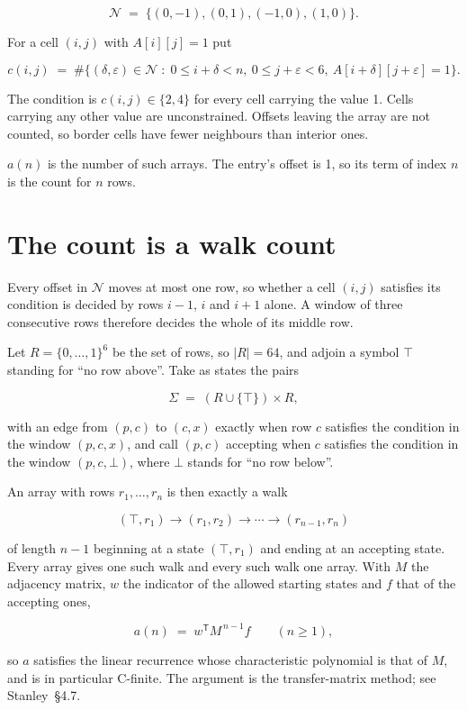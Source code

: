 \documentclass[11pt]{article}
\theoremstyle{definition}
\begin{document}
\[\mathcal{N} \;=\; \{(0,-1), (0,1), (-1,0), (1,0)\}.\]

For a cell $(i,j)$ with $A[i][j] = 1$ put

\[c(i,j) \;=\; \#\bigl\{(\delta,\varepsilon)\in\mathcal{N} \;:\; 0\le i+\delta<n,\ 0\le j+\varepsilon<6,\ A[i+\delta][j+\varepsilon] = 1\bigr\}.\]

The condition is $c(i,j) \in \{2, 4\}$ for every cell carrying the value 1. Cells carrying any other value are unconstrained. Offsets leaving the array are not counted, so border cells have fewer neighbours than interior ones.

$a(n)$ is the number of such arrays. The entry's offset is 1, so its term of index $n$ is the count for $n$ rows.

\section{The count is a walk count}

Every offset in $\mathcal{N}$ moves at most one row, so whether a cell $(i,j)$ satisfies its condition is decided by rows $i-1$, $i$ and $i+1$ alone. A window of three consecutive rows therefore decides the whole of its middle row.

Let $R = \{0,\dots,1\}^{6}$ be the set of rows, so $|R| = 64$, and adjoin a symbol $\top$ standing for ``no row above''. Take as states the pairs

\[\Sigma \;=\; (R \cup \{\top\}) \times R,\]

with an edge from $(p,c)$ to $(c,x)$ exactly when row $c$ satisfies the condition in the window $(p,c,x)$, and call $(p,c)$ accepting when $c$ satisfies the condition in the window $(p,c,\bot)$, where $\bot$ stands for ``no row below''.

An array with rows $r_1,\dots,r_n$ is then exactly a walk

\[(\top,r_1) \to (r_1,r_2) \to \cdots \to (r_{n-1},r_n)\]

of length $n-1$ beginning at a state $(\top,r_1)$ and ending at an accepting state. Every array gives one such walk and every such walk one array. With $M$ the adjacency matrix, $w$ the indicator of the allowed starting states and $f$ that of the accepting ones,

\[a(n) \;=\; w^{\mathsf T} M^{\,n-1} f \qquad (n \ge 1),\]

so $a$ satisfies the linear recurrence whose characteristic polynomial is that of $M$, and is in particular C-finite. The argument is the transfer-matrix method; see Stanley~\S4.7.
\end{document}
